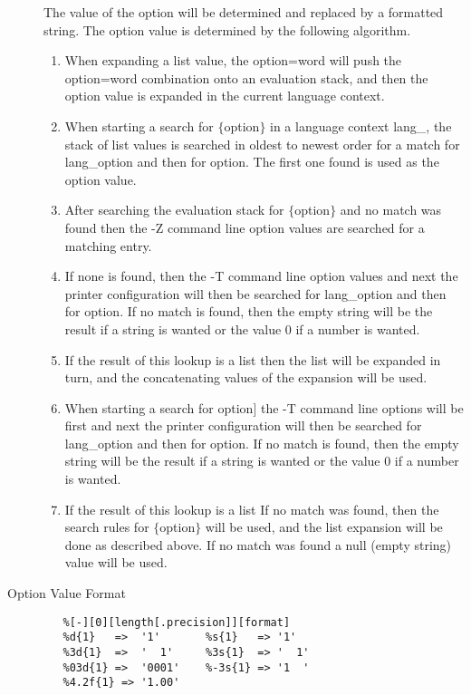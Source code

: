 \documentclass[a4paper]{article}
\begin{document}
\begin{description}
The value of the option will be determined and replaced by a formatted string.
The option value is determined by the following algorithm.
\begin{enumerate}
\item When expanding a list value, the
{\ttfamily option=word}
will push the
{\ttfamily option=word}
combination onto an evaluation stack,
and then the {\ttfamily option} value is expanded in the
current language context.
\item When starting a search for
{\ttfamily $\{$option$\}$}
in a language context {\ttfamily lang\_},
the stack of list values is searched in oldest to newest order for a match
for {\ttfamily lang\_option} and then for {\ttfamily option}.
The first one found is used as the option value.
\item After searching the evaluation stack for
{\ttfamily $\{$option$\}$}
and no match was found then the {\ttfamily -Z} command line option values
are searched for a matching entry.
\item If none is found, then the {\ttfamily -T} command line option values
and next the printer configuration will then be searched for
{\ttfamily lang\_option} and then for {\ttfamily option}.
If no match is found,  then the empty string will be the result
if a string is wanted or the value 0 if a number is wanted.
\item If the result of this lookup is a list
then the list will be expanded in turn,
and the concatenating values of the expansion will be used.
\item When starting a search for
{\ttfamily {[}option{]}}
the 
{\ttfamily -T} command line options will be first
and next the printer configuration will then be searched for
{\ttfamily lang\_option} and then for {\ttfamily option}.
If no match is found,  then the empty string will be the result
if a string is wanted or the value 0 if a number is wanted.
\item If the result of this lookup is a list
If no match was found,
then the search rules for 
{\ttfamily $\{$option$\}$}
will be used,
and the list expansion will be done as described above.
If no match was found a null (empty string) value will be used.
\end{enumerate}


\item[Option Value Format] \mbox{}

\begin{tscreen}
\begin{verbatim}
   %[-][0][length[.precision]][format]
   %d{1}   =>  '1'       %s{1}   => '1'
   %3d{1}  =>  '  1'     %3s{1}  => '  1'
   %03d{1} =>  '0001'    %-3s{1} => '1  '
   %4.2f{1} => '1.00'
\end{verbatim}
\end{tscreen}


\end{description}
\end{document}
